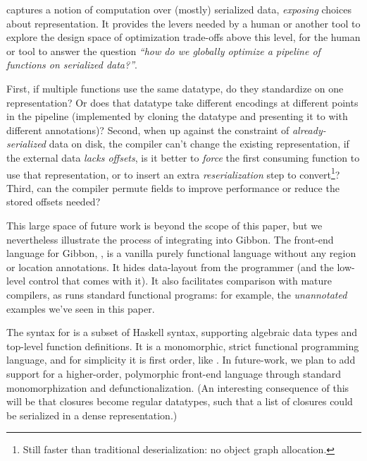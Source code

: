 \documentclass[showabstract,showacknowledgments,showpreface,showdedication]{iuphd}
\theoremstyle{nonumberplain}
\begin{document}
\ourcalc captures a notion of computation over (mostly) serialized data,
\emph{exposing} choices about representation. It provides the levers needed by a human
or another tool to explore the design space of optimization trade-offs above
this level, \ie{} for the human or tool to answer the question
\emph{``how do we globally optimize a pipeline of functions on serialized data?''}.

   First, if multiple functions use the same datatype, do they standardize on one
    representation?  Or does that datatype take different encodings at different
    points in the pipeline (implemented by cloning the datatype and
    presenting it to \ourcalc with different annotations)?
%    
    Second, when up against the constraint of {\em already-serialized} data on
    disk, the compiler can't change the existing representation, if the
    external data \emph{lacks offsets}, is it better to \emph{force}
    the first consuming function to use that representation, or to insert an
    extra {\em reserialization} step to convert\footnote{Still faster
    than traditional deserialization: no object graph allocation.}?
%
    Third, can the compiler permute fields to improve performance or reduce the
    stored offsets needed?

This large space of future work is beyond the scope of this paper, but we nevertheless
illustrate the process of
integrating \ourcalc into Gibbon.
%
The front-end language for Gibbon, \lamadt, is a vanilla purely functional
language without any region or location
annotations.  It hides data-layout from the programmer (and the low-level
control that comes with it).  It also facilitates comparison with 
mature compilers, as \lamadt runs standard functional programs:
for example, the {\em unannotated} examples we've seen in this paper.

{The syntax for \lamadt is a subset of Haskell syntax, supporting
  algebraic data types and top-level function definitions. It is a
  monomorphic, strict functional programming language, and for
  simplicity it is first order, like \ourcalc.}
{In future-work, we plan to add support for a higher-order, polymorphic
  front-end language through standard monomorphization and defunctionalization.
  (An interesting consequence of this will be that closures become regular
  datatypes, such that a list of closures could be serialized in a dense
  representation.)}
\end{document}
